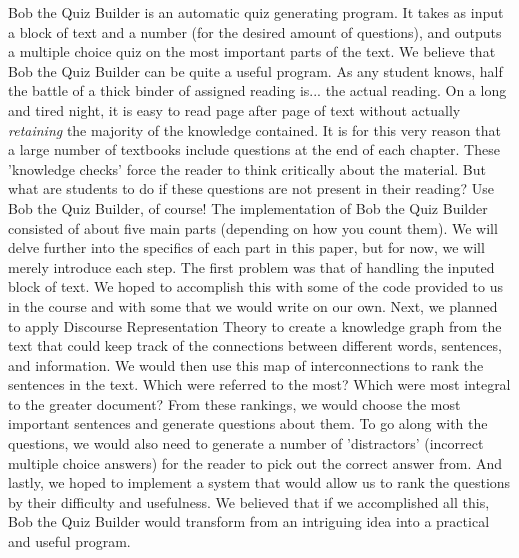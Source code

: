 \documentclass[finalcopy]{srpaper}
\begin{document}
Bob the Quiz Builder is an automatic quiz generating program. It takes as input a block of text and a number (for the desired amount of questions), and outputs a multiple choice quiz on the most important parts of the text.
\newline
We believe that  Bob the Quiz Builder can be quite a useful program. As any student knows, half the battle of a thick binder of assigned reading is... the actual reading. On a long and tired night, it is easy to read page after page of text without actually \textit{retaining} the majority of the knowledge contained.  It is for this very reason that a large number of textbooks include questions at the end of each chapter. These 'knowledge checks' force the reader to think critically about the material. But what are students to do if these questions are not present in their reading? Use Bob the Quiz Builder, of course!
\newline
The implementation of Bob the Quiz Builder consisted of about five main parts (depending on how you count them). We will delve further into the specifics of each part in this paper, but for now, we will merely introduce each step.
\newline
The first problem was that of handling the inputed block of text. We hoped to accomplish this with some of the code provided to us in the course and with some that we would write on our own. Next, we planned to apply Discourse Representation Theory to create a knowledge graph from the text that could keep track of the connections between different words, sentences, and information. We would then use this map of interconnections to rank the sentences in the text. Which were referred to the most? Which were most integral to the greater document? From these rankings, we would choose the most important sentences and generate questions about them. To go along with the questions, we would also need to generate a number of 'distractors' (incorrect multiple choice answers) for the reader to pick out the correct answer from. And lastly, we hoped to implement a system that would allow us to rank the questions by their difficulty and usefulness. We believed that if we accomplished all this, Bob the Quiz Builder would transform from an intriguing idea into a practical and useful program.
\newline



%
%
\end{document}
